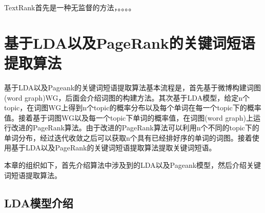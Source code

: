 \documentclass[master]{njuthesis}
\begin{document}
    TextRank首先是一种无监督的方法，。。。。


\section{基于LDA以及PageRank的关键词短语提取算法}

    基于LDA以及Pageank的关键词短语提取算法基本流程是，首先基于微博构建词图(word graph)WG，后面会介绍词图的构建方法。其次基于LDA模型，给定n个topic，在词图WG上得到n个topic的概率分布以及每个单词在每一个topic下的概率值。接着基于词图WG以及每一个topic下单词的概率值，在词图(word graph)上运行改进的PageRank算法。由于改进的PageRank算法可以利用n个不同的topic下的单词分布，经过迭代收敛之后可以获取n个具有已经排好序的单词的词图。接着使用基于LDA以及PageRank的关键词短语提取算法提取关键词短语。
    
    本章的组织如下，首先介绍算法中涉及到的LDA以及Pageank模型，然后介绍关键词短语提取算法。

 
\subsection{LDA模型介绍}
\end{document}
